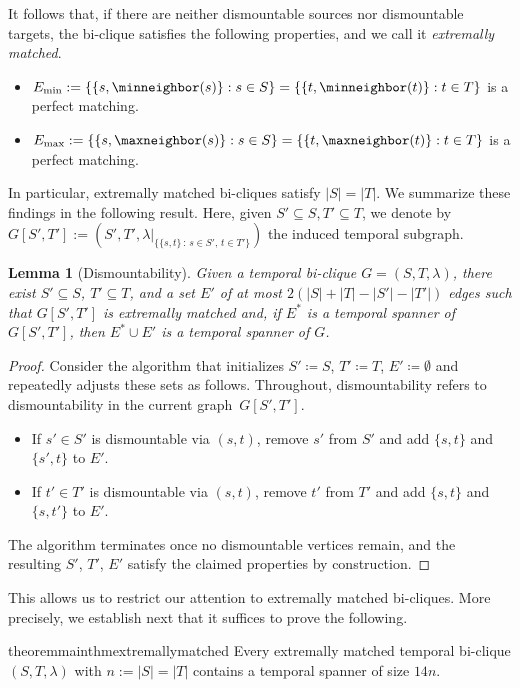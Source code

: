 \documentclass[11pt, letterpaper]{article}
\renewcommand{\subset}{\subseteq}
\newcommand{\minedges}{E_{\mathrm{min}}}
\newcommand{\maxedges}{E_{\mathrm{max}}}
\theoremstyle{definition}
\theoremstyle{plain}
\newtheorem{lemma}[definition]{Lemma}
\begin{document}
It follows that, if there are neither dismountable sources nor dismountable targets, the bi-clique satisfies the following properties, and we call it \emph{extremally matched}.
\begin{itemize}
  \item $\minedges:=\{\{s,\minneighbor(s)\}:s \in S\}=
        \{\{t,\minneighbor(t)\}:t \in T\}$ is a perfect matching.
  \item $\maxedges:=\{\{s,\maxneighbor(s)\}:s \in S\}=
        \{\{t,\maxneighbor(t)\}:t \in T\}$ is a perfect matching.
\end{itemize}
In particular, extremally matched bi-cliques satisfy $|S|=|T|$.
We summarize these findings in the following result.
Here, given $S'\subset S, T'\subset T$, we denote by $G[S',T']:=(S',T',\lambda|_{\{\{s,t\}\,:\,s\in S',\,t\in T'\}})$ the induced temporal subgraph.

\begin{lemma}[Dismountability]
\label{lem:dismountable}
Given a temporal bi-clique $G=(S,T,\lambda)$, there exist $S'\subseteq S$, $T'\subseteq T$, and a set $E'$ of at most $2(|S|+|T|-|S'|-|T'|)$ edges such that $G[S',T']$ is extremally matched and, if $E^*$ is a temporal spanner of $G[S',T']$, then $E^*\cup E'$ is a temporal spanner of $G$.
\end{lemma}

\begin{proof}
Consider the algorithm that initializes $S'\coloneqq S$, $T'\coloneqq T$, $E'\coloneqq\emptyset$ and repeatedly adjusts these sets as follows.
Throughout, dismountability refers to dismountability in the current graph~$G[S',T']$.
\begin{itemize}
  \item If $s'\in S'$ is dismountable via $(s,t)$, remove $s'$ from $S'$
        and add $\{s,t\}$ and $\{s',t\}$ to $E'$.
  \item If $t'\in T'$ is dismountable via $(s,t)$, remove $t'$ from $T'$
        and add $\{s,t\}$ and $\{s,t'\}$ to $E'$.
\end{itemize}
The algorithm terminates once no dismountable vertices remain, and the resulting $S'$, $T'$, $E'$ satisfy the claimed properties by construction.
\end{proof}


This allows us to restrict our attention to extremally matched bi-cliques.
More precisely, we establish next that it suffices to prove the following.

\begin{restatable}{theorem}{mainthmextremallymatched}
\label{thm:mainthm_extremally_matched}
Every extremally matched temporal bi-clique $(S,T,\lambda)$ with $n:=|S|=|T|$ contains a temporal spanner of size $14n$.
\end{restatable}
\end{document}
